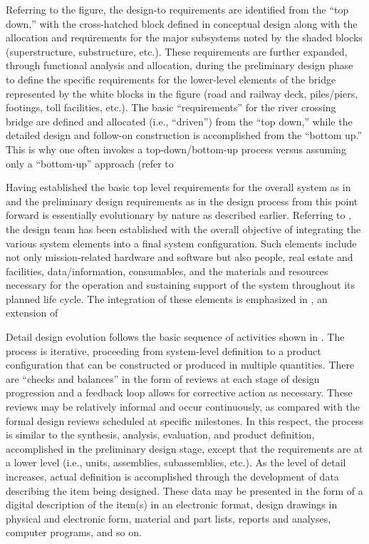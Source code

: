 Referring to the figure, the design-to requirements are identified from the ``top down,'' with the cross-hatched block defined in conceptual design along with the allocation and requirements for the major subsystems noted by the shaded blocks (superstructure, substructure, etc.). These requirements are further expanded, through functional analysis and allocation, during the preliminary design phase to define the specific requirements for the lower-level elements of the bridge represented by the white blocks in the figure (road and railway deck, piles/piers, footings, toll facilities, etc.). The basic ``requirements'' for the river crossing bridge are defined and allocated (i.e., ``driven'') from the ``top down,'' while the detailed design and follow-on construction is accomplished from the ``bottom up.'' This is why one often invokes a top-down/bottom-up process versus assuming only a ``bottom-up'' approach (refer to 

Having established the basic top level requirements for the overall system as in and the preliminary design requirements as in the design process from this point forward is essentially evolutionary by nature as described earlier. Referring to , the design team has been established with the overall objective of integrating the various system elements into a final system configuration. Such elements include not only mission-related hardware and software but also people, real estate and facilities, data/information, consumables, and the materials and resources necessary for the operation and sustaining support of the system throughout its planned life cycle. The integration of these elements is emphasized in , an extension of 

Detail design evolution follows the basic sequence of activities shown in . The process is iterative, proceeding from system-level definition to a product configuration that can be constructed or produced in multiple quantities. There are “checks and balances” in the form of reviews at each stage of design progression and a feedback loop allows for corrective action as necessary. These reviews may be relatively informal and occur continuously, as compared with the formal design reviews scheduled at specific milestones. In this respect, the process is similar to the synthesis, analysis, evaluation, and product definition, accomplished in the preliminary design stage, except that the requirements are at a lower level (i.e., units, assemblies, subassemblies, etc.). As the level of detail increases, actual definition is accomplished through the development of data describing the item being designed. These data may be presented in the form of a digital description of the item(s) in an electronic format, design drawings in physical and electronic form, material and part lists, reports and analyses, computer programs, and so on.

